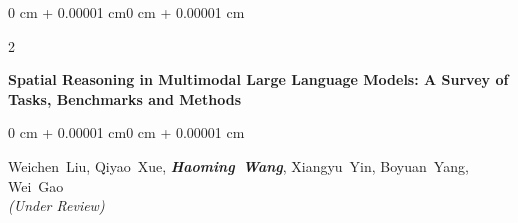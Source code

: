 \documentclass[10pt, letterpaper]{article}
\newenvironment{onecolentry}{
    \begin{adjustwidth}{0 cm + 0.00001 cm}{0 cm + 0.00001 cm}
}{
    \end{adjustwidth}
}
\newenvironment{twocolentry}[2][]{
    \onecolentry
    \def\secondColumn{#2}
    \setcolumnwidth{\fill, 4.5 cm}
    \begin{paracol}{2}
}{
    \switchcolumn \raggedleft \secondColumn
    \end{paracol}
    \endonecolentry
}
\begin{document}
\begin{samepage}
            \vspace{0.3 cm}

            \begin{twocolentry}{
                2024
            }
                \textbf{Spatial Reasoning in Multimodal Large Language Models: A Survey of Tasks, Benchmarks and Methods}
            \end{twocolentry}
            \vspace{0.10 cm}
            \begin{onecolentry}
                \mbox{Weichen Liu}, \mbox{Qiyao Xue}, \mbox{\textbf{\textit{Haoming Wang}}}, \mbox{Xiangyu Yin}, \mbox{Boyuan Yang}, \mbox{Wei Gao}
                \vspace{0.10 cm}
                \\ \textit{(Under Review)}
            \end{onecolentry}

        \end{samepage}
\end{document}
